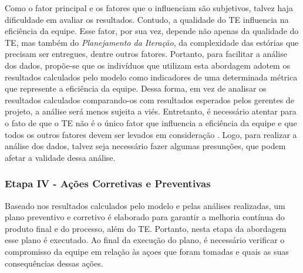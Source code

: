 Como o fator principal e os fatores que o influenciam são subjetivos, talvez haja dificuldade em avaliar os resultados. Contudo, a qualidade do TE influencia na eficiência da equipe. Esse fator, por sua vez, depende não apenas da qualidade do TE, mas também do \textit{Planejamento da Iteração}, da complexidade das estórias que precisam ser entregues, dentre outros fatores. Portanto, para facilitar a análise dos dados, propõe-se que os indivíduos que utilizam esta abordagem adotem os resultados calculados pelo modelo como indicadores de uma determinada métrica que represente a eficiência da equipe. Dessa forma, em vez de analisar os resultados calculados comparando-os com resultados esperados pelos gerentes de projeto, a análise será menos sujeita a viés. Entretanto, é necessário atentar para o fato de que o TE não é o único fator que influencia a eficiência da equipe e que todos os outros fatores devem ser levados em consideração . Logo, para realizar a análise dos dados, talvez seja necessário fazer algumas presunções, que podem afetar a validade dessa análise.


\subsubsection{Etapa IV - Ações Corretivas e Preventivas}
\label{descricao:acoes}

Baseado nos resultados calculados pelo modelo e pelas análises realizadas, um plano preventivo e corretivo é elaborado para garantir a melhoria contínua do produto final e do processo, além do TE. Portanto, nesta etapa da abordagem esse plano é executado. Ao final da execução do plano, é necessário verificar o compromisso da equipe em relação às açoes que foram tomadas e quais as suas consequências dessas ações. 